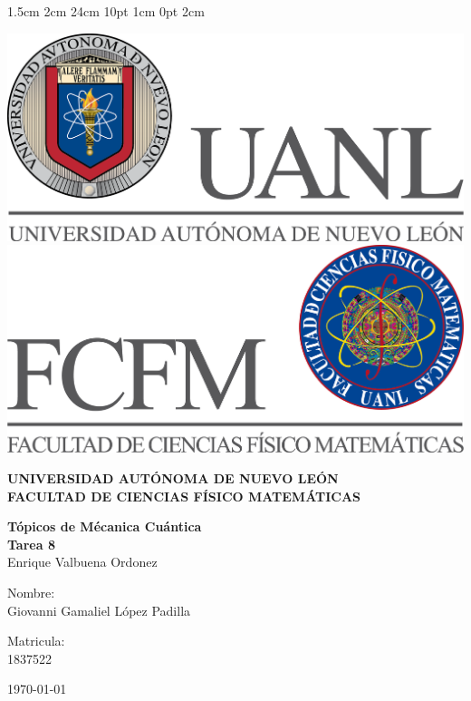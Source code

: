 \documentclass[12pt,letterpaper]{report}
\begin{document}
\setmargins{2.5cm}      
{1.5cm}                     
{2cm}  
{24cm}                    
{10pt}                          
{1cm}                          
{0pt}                             
{2cm}
\begin{titlepage}
\begin{center}
\includegraphics[scale=0.40]{../../Logos/uanl.png} 
\hspace{2.5cm}
\includegraphics[scale=0.40]{../../Logos/fcfm.png}
\end{center}
\vspace{2cm}
\begin{center}
\textbf{
UNIVERSIDAD AUTÓNOMA DE NUEVO LEÓN\\
FACULTAD DE CIENCIAS
    FÍSICO MATEMÁTICAS}\\
\vspace*{2cm}
\begin{large}
\vspace{1cm}
\large{\textbf{Tópicos de Mécanica Cuántica}}\\
\textbf{Tarea 8}\\
Enrique Valbuena Ordonez\\
\end{large}
\vspace{3.5cm}
\begin{minipage}{0.6\linewidth}
\vspace{0.5cm}
\changefontsizes{14pt}
Nombre:\\
Giovanni Gamaliel López Padilla\\
\end{minipage}
\begin{minipage}{0.2\linewidth}
\changefontsizes{14pt}
Matricula:\\
1837522
\end{minipage}
\end{center}
\vspace{4cm}
\begin{flushright}
\today
\end{flushright}
\end{titlepage}
\end{document}
